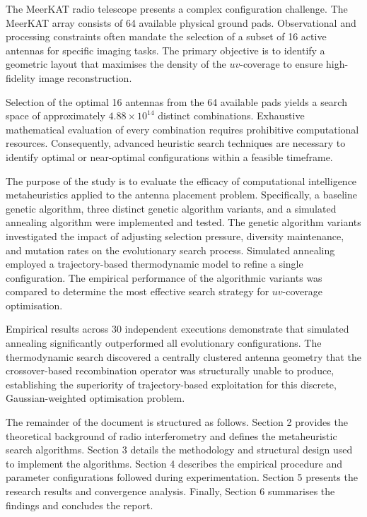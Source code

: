 \documentclass[conference]{IEEEtran}
\begin{document}
The MeerKAT radio telescope presents a complex configuration challenge. The MeerKAT array 
consists of 64 available physical ground pads. Observational and processing constraints often 
mandate the selection of a subset of 16 active antennas for specific imaging tasks. 
The primary objective is to identify a geometric layout that maximises the density of 
the $uv$-coverage to ensure high-fidelity image reconstruction. 

Selection of the optimal 16 antennas from the 64 available pads yields a search space of 
approximately $4.88 \times 10^{14}$ distinct combinations. Exhaustive mathematical evaluation 
of every combination requires prohibitive computational resources. Consequently, advanced 
heuristic search techniques are necessary to identify optimal or near-optimal configurations 
within a feasible timeframe. 

The purpose of the study is to evaluate the efficacy of computational intelligence metaheuristics 
applied to the antenna placement problem. Specifically, a baseline genetic algorithm, 
three distinct genetic algorithm variants, and a simulated annealing algorithm were 
implemented and tested. The genetic algorithm variants investigated the impact of adjusting 
selection pressure, diversity maintenance, and mutation rates on the evolutionary search process. 
Simulated annealing employed a trajectory-based thermodynamic model to refine a single configuration. 
The empirical performance of the algorithmic variants was compared to determine the most effective 
search strategy for $uv$-coverage optimisation.

Empirical results across 30 independent executions demonstrate that simulated annealing 
significantly outperformed all evolutionary configurations. The thermodynamic search 
discovered a centrally clustered antenna geometry that the crossover-based recombination 
operator was structurally unable to produce, establishing the superiority of trajectory-based 
exploitation for this discrete, Gaussian-weighted optimisation problem.

The remainder of the document is structured as follows. Section 2 provides the theoretical 
background of radio interferometry and defines the metaheuristic search algorithms. Section 3 
details the methodology and structural design used to implement the algorithms. Section 4 
describes the empirical procedure and parameter configurations followed during experimentation. 
Section 5 presents the research results and convergence analysis. Finally, Section 6 summarises 
the findings and concludes the report.
\end{document}
